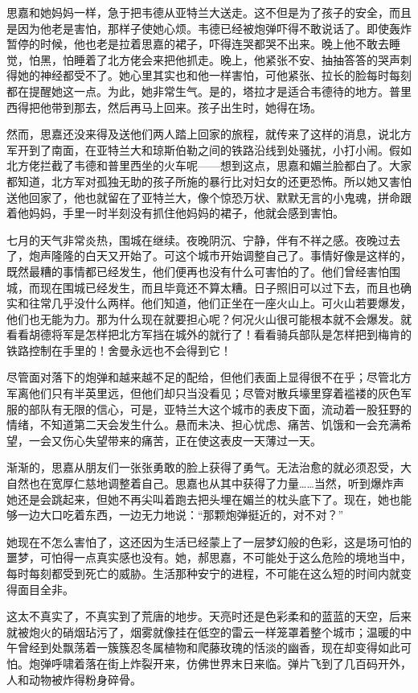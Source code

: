 \par 思嘉和她妈妈一样，急于把韦德从亚特兰大送走。这不但是为了孩子的安全，而且是因为他老是害怕，那样子使她心烦。韦德已经被炮弹吓得不敢说话了。即使轰炸暂停的时候，他也老是拉着思嘉的裙子，吓得连哭都哭不出来。晚上他不敢去睡觉，怕黑，怕睡着了北方佬会来把他抓走。晚上，他紧张不安、抽抽答答的哭声刺得她的神经都受不了。她心里其实也和他一样害怕，可他紧张、拉长的脸每时每刻都在提醒她这一点。为此，她非常生气。是的，塔拉才是适合韦德待的地方。普里西得把他带到那去，然后再马上回来。孩子出生时，她得在场。
\par 然而，思嘉还没来得及送他们两人踏上回家的旅程，就传来了这样的消息，说北方军开到了南面，在亚特兰大和琼斯伯勒之间的铁路沿线到处骚扰，小打小闹。假如北方佬拦截了韦德和普里西坐的火车呢——想到这点，思嘉和媚兰脸都白了。大家都知道，北方军对孤独无助的孩子所施的暴行比对妇女的还更恐怖。所以她又害怕送他回家了，他也就留在了亚特兰大，像个惊恐万状、默默无言的小鬼魂，拼命跟着他妈妈，手里一时半刻没有抓住他妈妈的裙子，他就会感到害怕。
\par 七月的天气非常炎热，围城在继续。夜晚阴沉、宁静，伴有不祥之感。夜晚过去了，炮声隆隆的白天又开始了。可这个城市开始调整自己了。事情好像是这样的，既然最糟的事情都已经发生，他们便再也没有什么可害怕的了。他们曾经害怕围城，而现在围城已经发生，而且毕竟还不算太糟。日子照旧可以过下去，而且也确实和往常几乎没什么两样。他们知道，他们正坐在一座火山上。可火山若要爆发，他们也无能为力。那为什么现在就要担心呢？何况火山很可能根本就不会爆发。就看看胡德将军是怎样把北方军挡在城外的就行了！看看骑兵部队是怎样把到梅肯的铁路控制在手里的！舍曼永远也不会得到它！
\par 尽管面对落下的炮弹和越来越不足的配给，但他们表面上显得很不在乎；尽管北方军离他们只有半英里远，但他们却只当没看见；尽管对散兵壕里穿着褴褛的灰色军服的部队有无限的信心，可是，亚特兰大这个城市的表皮下面，流动着一股狂野的情绪，不知道第二天会发生什么。悬而未决、担心忧虑、痛苦、饥饿和一会充满希望，一会又伤心失望带来的痛苦，正在使这表皮一天薄过一天。
\par 渐渐的，思嘉从朋友们一张张勇敢的脸上获得了勇气。无法治愈的就必须忍受，大自然也在宽厚仁慈地调整着自己。思嘉也从其中获得了力量……当然，听到爆炸声她还是会跳起来，但她不再尖叫着跑去把头埋在媚兰的枕头底下了。现在，她也能够一边大口吃着东西，一边无力地说：“那颗炮弹挺近的，对不对？”
\par 她现在不怎么害怕了，这还因为生活已经蒙上了一层梦幻般的色彩，这是场可怕的噩梦，可怕得一点真实感也没有。她，郝思嘉，不可能处于这么危险的境地当中，每时每刻都受到死亡的威胁。生活那种安宁的进程，不可能在这么短的时间内就变得面目全非。
\par 这太不真实了，不真实到了荒唐的地步。天亮时还是色彩柔和的蓝蓝的天空，后来就被炮火的硝烟玷污了，烟雾就像挂在低空的雷云一样笼罩着整个城市；温暖的中午曾经到处飘荡着一簇簇忍冬属植物和爬藤玫瑰的恬淡的幽香，现在却变得如此可怕。炮弹呼啸着落在街上炸裂开来，仿佛世界末日来临。弹片飞到了几百码开外，人和动物被炸得粉身碎骨。
